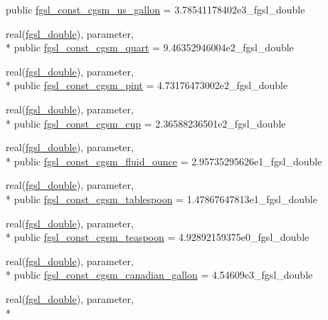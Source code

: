 \begin{DoxyCompactItemize}
public \hyperlink{classfgsl_a9fdaf0160e636b5a341738f1038e6671}{fgsl\-\_\-const\-\_\-cgsm\-\_\-us\-\_\-gallon} = 3.\-78541178402e3\-\_\-fgsl\-\_\-double
\item 
real(\hyperlink{classfgsl_a9af5113378e0f000eb479d3f90196ddf}{fgsl\-\_\-double}), parameter, \\*
public \hyperlink{classfgsl_a1dd9210eaaf96e8f99597ede1f808892}{fgsl\-\_\-const\-\_\-cgsm\-\_\-quart} = 9.\-46352946004e2\-\_\-fgsl\-\_\-double
\item 
real(\hyperlink{classfgsl_a9af5113378e0f000eb479d3f90196ddf}{fgsl\-\_\-double}), parameter, \\*
public \hyperlink{classfgsl_a77fc850550f8adbaa35a17890fe1ddb6}{fgsl\-\_\-const\-\_\-cgsm\-\_\-pint} = 4.\-73176473002e2\-\_\-fgsl\-\_\-double
\item 
real(\hyperlink{classfgsl_a9af5113378e0f000eb479d3f90196ddf}{fgsl\-\_\-double}), parameter, \\*
public \hyperlink{classfgsl_aa3f891d5605128364396d3ae108b3d43}{fgsl\-\_\-const\-\_\-cgsm\-\_\-cup} = 2.\-36588236501e2\-\_\-fgsl\-\_\-double
\item 
real(\hyperlink{classfgsl_a9af5113378e0f000eb479d3f90196ddf}{fgsl\-\_\-double}), parameter, \\*
public \hyperlink{classfgsl_ada803a980994f045ecc9fa32cebad23b}{fgsl\-\_\-const\-\_\-cgsm\-\_\-fluid\-\_\-ounce} = 2.\-95735295626e1\-\_\-fgsl\-\_\-double
\item 
real(\hyperlink{classfgsl_a9af5113378e0f000eb479d3f90196ddf}{fgsl\-\_\-double}), parameter, \\*
public \hyperlink{classfgsl_ad8c01acfc1ba5ba62f1c97aa1b0d8142}{fgsl\-\_\-const\-\_\-cgsm\-\_\-tablespoon} = 1.\-47867647813e1\-\_\-fgsl\-\_\-double
\item 
real(\hyperlink{classfgsl_a9af5113378e0f000eb479d3f90196ddf}{fgsl\-\_\-double}), parameter, \\*
public \hyperlink{classfgsl_a46a096885f2709ea27ce6f1b8f59c279}{fgsl\-\_\-const\-\_\-cgsm\-\_\-teaspoon} = 4.\-92892159375e0\-\_\-fgsl\-\_\-double
\item 
real(\hyperlink{classfgsl_a9af5113378e0f000eb479d3f90196ddf}{fgsl\-\_\-double}), parameter, \\*
public \hyperlink{classfgsl_a3a07299d97f40e47785e44126a457907}{fgsl\-\_\-const\-\_\-cgsm\-\_\-canadian\-\_\-gallon} = 4.\-54609e3\-\_\-fgsl\-\_\-double
\item 
real(\hyperlink{classfgsl_a9af5113378e0f000eb479d3f90196ddf}{fgsl\-\_\-double}), parameter, \\*

\end{DoxyCompactItemize}
